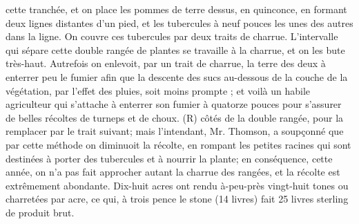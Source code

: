 cette tranchée, et on place les pommes de terre dessus, en quinconce, en formant deux lignes distantes d’un pied, et les tubercules à neuf pouces les unes des autres dans la ligne. On couvre ces tubercules par deux traits de charrue. L’intervalle qui sépare cette double rangée de plantes se travaille à la charrue, et on les bute très-haut. Autrefois on enlevoit, par un trait de charrue, la terre des deux à enterrer peu le fumier afin que la descente des sucs au-dessous de la couche de la végétation, par l’effet des pluies, soit moins prompte ; et voilà un habile agriculteur qui s’attache à enterrer son fumier à quatorze pouces pour s’assurer de belles récoltes de turneps et de choux. (R)\setcounter{page}{213} côtés de la double rangée, pour la remplacer par le trait suivant; mais l'intendant, Mr. Thomson, a soupçonné que par cette méthode on diminuoit la récolte, en rompant les petites racines qui sont destinées à porter des tubercules et à nourrir la plante; en conséquence, cette année, on n'a pas fait approcher autant la charrue des rangées, et la récolte est extrêmement abondante. Dix-huit acres ont rendu à-peu-près vingt-huit tones ou charretées par acre, ce qui, à trois pence le stone (14 livres) fait 25 livres sterling de produit brut.
